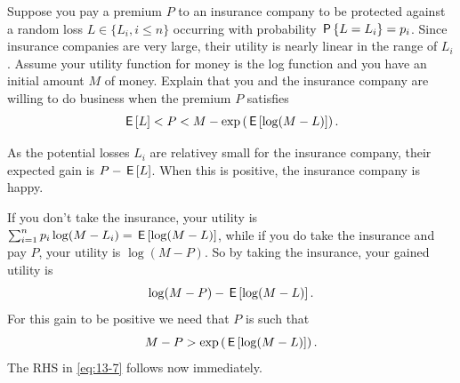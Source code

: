 \documentclass[lectures]{subfiles}
\begin{document}
\begin{exercise}
Suppose you pay a premium $P$ to an insurance company to be protected against a random loss $L \in \{L_{i}, i \leq n\}$ occurring with probability $\P{L = L_{i}} = p_{i}$.
Since insurance companies are very large, their utility is nearly linear in the range of $L_{i}$.
Assume your utility function for money is the log function and you have an initial amount $M$ of money.
Explain that you and the insurance company are willing to do business when the premium $P$ satisfies
\begin{equation}
  \label{eq:13-7}
\E L < P <   M - \exp\left(\E{\log (M-L)}\right).
\end{equation}
\begin{solution}

As the potential losses $L_{i}$ are relativey small for  the insurance company, their expected gain is $P-\E L$. When this is positive, the insurance company is happy.

If you don't take the insurance, your utility is  $\sum_{i=1}^{n} p_{i} \log (M-L_{i}) = \E{\log(M-L)}$, while if you do take the insurance and pay $P$, your utility is $\log(M-P)$. So by taking the insurance, your gained utility is
\begin{equation}
  \label{eq:8}
\log(M-P) - \E{\log(M-L)}.
\end{equation}
For this gain to be  positive we need that $P$ is such that
\begin{equation}
  \label{eq:9}
M-P > \exp\left(\E{\log(M-L)}\right).
\end{equation}
The RHS in \cref{eq:13-7} follows now immediately.
\end{solution}
\end{exercise}
\end{document}
